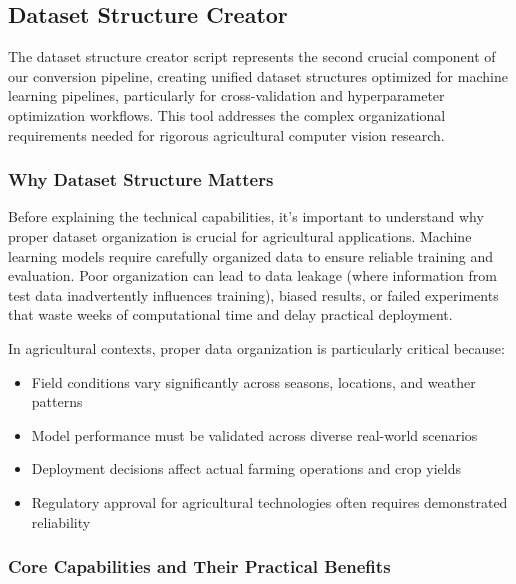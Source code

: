 \subsection{Dataset Structure Creator}

The dataset structure creator script represents the second crucial component of our conversion pipeline, creating unified dataset structures optimized for machine learning pipelines, particularly for cross-validation and hyperparameter optimization workflows. This tool addresses the complex organizational requirements needed for rigorous agricultural computer vision research.

\subsubsection{Why Dataset Structure Matters}

Before explaining the technical capabilities, it's important to understand why proper dataset organization is crucial for agricultural applications. Machine learning models require carefully organized data to ensure reliable training and evaluation. Poor organization can lead to data leakage (where information from test data inadvertently influences training), biased results, or failed experiments that waste weeks of computational time and delay practical deployment.

In agricultural contexts, proper data organization is particularly critical because:
\begin{itemize}
    \item Field conditions vary significantly across seasons, locations, and weather patterns
    \item Model performance must be validated across diverse real-world scenarios
    \item Deployment decisions affect actual farming operations and crop yields
    \item Regulatory approval for agricultural technologies often requires demonstrated reliability
\end{itemize}

\subsubsection{Core Capabilities and Their Practical Benefits}

